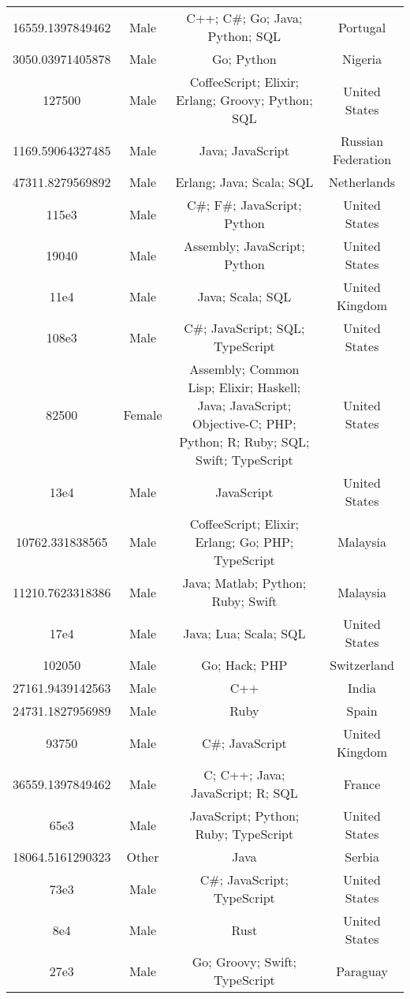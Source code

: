 \begin{center}
\begin{tabular}{ |c|c|c|c| }
16559.1397849462  &  Male  &  C++; C\#; Go; Java; Python; SQL  &  Portugal  \\ 
3050.03971405878  &  Male  &  Go; Python  &  Nigeria  \\ 
127500  &  Male  &  CoffeeScript; Elixir; Erlang; Groovy; Python; SQL  &  United States  \\ 
1169.59064327485  &  Male  &  Java; JavaScript  &  Russian Federation  \\ 
47311.8279569892  &  Male  &  Erlang; Java; Scala; SQL  &  Netherlands  \\ 
115e3  &  Male  &  C\#; F\#; JavaScript; Python  &  United States  \\ 
19040  &  Male  &  Assembly; JavaScript; Python  &  United States  \\ 
11e4  &  Male  &  Java; Scala; SQL  &  United Kingdom  \\ 
108e3  &  Male  &  C\#; JavaScript; SQL; TypeScript  &  United States  \\ 
82500  &  Female  &  Assembly; Common Lisp; Elixir; Haskell; Java; JavaScript; Objective-C; PHP; Python; R; Ruby; SQL; Swift; TypeScript  &  United States  \\ 
13e4  &  Male  &  JavaScript  &  United States  \\ 
10762.331838565  &  Male  &  CoffeeScript; Elixir; Erlang; Go; PHP; TypeScript  &  Malaysia  \\ 
11210.7623318386  &  Male  &  Java; Matlab; Python; Ruby; Swift  &  Malaysia  \\ 
17e4  &  Male  &  Java; Lua; Scala; SQL  &  United States  \\ 
102050  &  Male  &  Go; Hack; PHP  &  Switzerland  \\ 
27161.9439142563  &  Male  &  C++  &  India  \\ 
24731.1827956989  &  Male  &  Ruby  &  Spain  \\ 
93750  &  Male  &  C\#; JavaScript  &  United Kingdom  \\ 
36559.1397849462  &  Male  &  C; C++; Java; JavaScript; R; SQL  &  France  \\ 
65e3  &  Male  &  JavaScript; Python; Ruby; TypeScript  &  United States  \\ 
18064.5161290323  &  Other  &  Java  &  Serbia  \\ 
73e3  &  Male  &  C\#; JavaScript; TypeScript  &  United States  \\ 
8e4  &  Male  &  Rust  &  United States  \\ 
27e3  &  Male  &  Go; Groovy; Swift; TypeScript  &  Paraguay  \\ 

\end{tabular}
\end{center}
